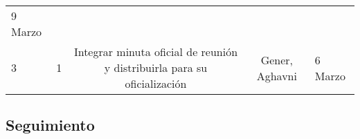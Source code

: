 \documentclass[]{book}
\begin{document}
\begin{longtable}[]{@{}lcccl@{}}
\begin{minipage}[t]{0.11\columnwidth}
9 Marzo\strut
\end{minipage}\tabularnewline
\begin{minipage}[t]{0.03\columnwidth}\raggedright\strut
3\strut
\end{minipage} & \begin{minipage}[t]{0.23\columnwidth}\centering\strut
1\strut
\end{minipage} & \begin{minipage}[t]{0.37\columnwidth}\centering\strut
Integrar minuta oficial de reunión y distribuirla para su
oficialización\strut
\end{minipage} & \begin{minipage}[t]{0.12\columnwidth}\centering\strut
Gener, Aghavni\strut
\end{minipage} & \begin{minipage}[t]{0.11\columnwidth}\raggedright\strut
6 Marzo\strut
\end{minipage}\tabularnewline
\bottomrule
\end{longtable}

\subsection{Seguimiento}\label{seguimiento-1}
\end{document}
